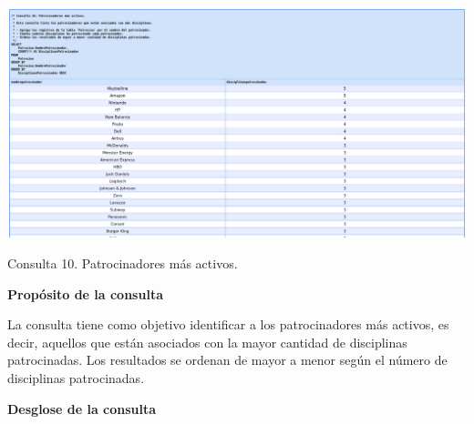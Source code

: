 \begin{center}
	\includegraphics[width=16.5cm]{resources/Chapters/Consultas/Imagenes/Consulta10.jpg} 
	
	Consulta 10. Patrocinadores más activos. 
\end{center}

\textbf{Propósito de la consulta}

La consulta tiene como objetivo identificar a los patrocinadores más activos, es decir, aquellos que están asociados con la mayor cantidad de disciplinas patrocinadas. Los resultados se ordenan de mayor a menor según el número de disciplinas patrocinadas.

\textbf{Desglose de la consulta}

